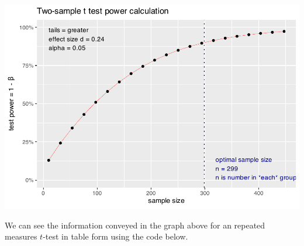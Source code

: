 \documentclass[
]{krantz}
\begin{document}
\includegraphics{bookdown_files/figure-latex/unnamed-chunk-349-1.pdf}

We can see the information conveyed in the graph above for an repeated measures \(t\)-test in table form using the code below.
\end{document}

